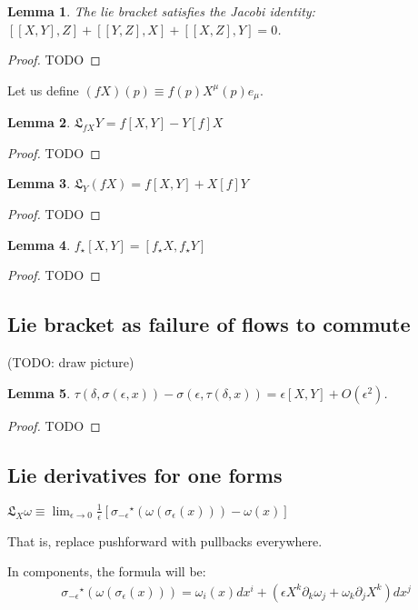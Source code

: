 \documentclass[11pt]{book}
\newcommand{\Lie}{\ensuremath{\mathfrak{L}}}
\newcommand{\pushforward}[1]{\ensuremath{{#1}_{\star}}}
\newcommand{\pullback}[1]{\ensuremath{{#1}^{\star}}}
\newtheorem{lemma}{Lemma}
\newtheorem{proof}{Proof}
\begin{document}
\begin{lemma}
The lie bracket satisfies the Jacobi identity: $[[X, Y], Z] + [[Y, Z], X] + [[X, Z], Y] = 0$.
\end{lemma}
\begin{proof}
TODO
\end{proof}

Let us define $(fX)(p) \equiv f(p) X^\mu(p) e_\mu$.

\begin{lemma}
$\Lie_{fX}Y = f[X, Y] - Y[f]X$
\end{lemma}
\begin{proof}
TODO
\end{proof}

\begin{lemma}
$\Lie_{Y} (fX) = f[X, Y] + X[f]Y$
\end{lemma}
\begin{proof}
TODO
\end{proof}

\begin{lemma}
$\pushforward f[X, Y] = [\pushforward f X, \pushforward f Y]$
\end{lemma}
\begin{proof}
TODO
\end{proof}

\subsection{Lie bracket as failure of flows to commute}

(TODO: draw picture)

\begin{lemma}
 $\tau(\delta, \sigma(\epsilon, x)) - \sigma(\epsilon, \tau(\delta, x)) = \epsilon [X, Y] + O(\epsilon ^2)$.
\end{lemma}
\begin{proof}
TODO
\end{proof}

\subsection{Lie derivatives for one forms}

$\Lie_X \omega \equiv \lim_{\epsilon \to 0} \frac{1}{\epsilon} 
\left[
\pullback{\sigma_{-\epsilon}} (\omega(\sigma_\epsilon(x))) - \omega(x)
\right]$

That is, replace pushforward with pullbacks everywhere.

In components, the formula will be:
\begin{align*}
    \pullback{\sigma_{-\epsilon}} (\omega(\sigma_\epsilon(x))) = \omega_i(x) dx^i + 
    (\epsilon X^k \partial_k \omega_j + \omega_k \partial_j X^k) dx^j
\end{align*}
\end{document}

